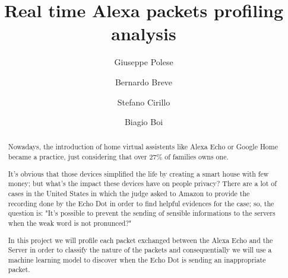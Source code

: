 \documentclass[sigconf]{acmart}
\begin{document}
    \title{Real time Alexa packets profiling analysis}


    \author{Giuseppe Polese}

    \author{Bernardo Breve}
    \author{Stefano Cirillo}

    \author{Biagio Boi}

    \begin{abstract}
        Nowadays, the introduction of home virtual assistents like Alexa Echo or Google Home became a practice, just considering that over 27\% of families owns one.

        It's obvious that those devices simplified the life by creating a smart house with few money; but what's the impact these devices have on people privacy?
        There are a lot of cases in the United States in which the judge asked to Amazon to provide the recording done by the Echo Dot in order to find helpful
        evidences for the case; so, the question is: "It's possible to prevent the sending of sensible informations to the servers when the weak word is not pronunced?"

        In this project we will profile each packet exchanged between the Alexa Echo and the Server in order to classify the nature of the packets and consequentially we will use a machine learning model to discover when the Echo Dot is sending an inappropriate packet.
    \end{abstract}
\end{document}
